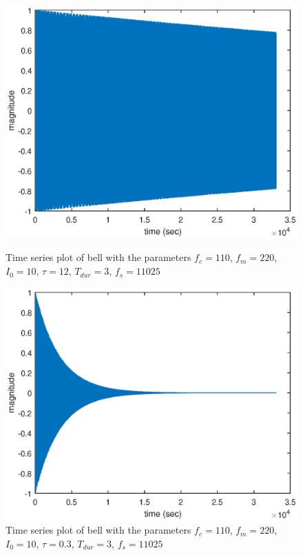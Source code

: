 \documentclass{article}
\begin{document}
\begin{figure}[H]
	\centering
	\begin{minipage}{0.3\linewidth}
		\includegraphics[scale=0.3]{time3}
		\caption{Time series plot of bell with the parameters $f_c = 110$, $f_m = 220$, $I_0 = 10$, $\tau = 12$, $T_{dur} = 3$, $f_s = 11025$}
	\end{minipage}
	\hspace{4cm}
	\begin{minipage}{0.3\linewidth}
		\includegraphics[scale=0.3]{time4}
		\caption{Time series plot of bell with the parameters $f_c = 110$, $f_m = 220$, $I_0 = 10$, $\tau = 0.3$, $T_{dur} = 3$, $f_s = 11025$}
	\end{minipage}
\end{figure}
\end{document}
